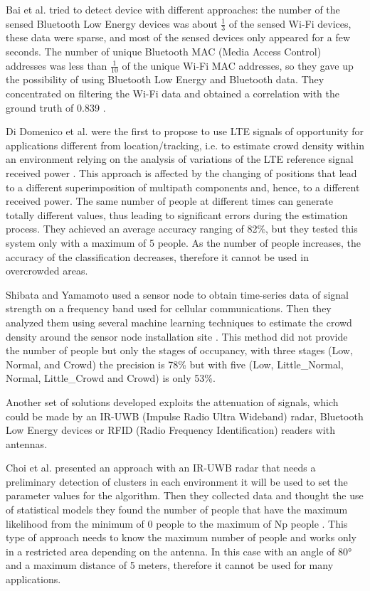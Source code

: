 Bai et al. tried to detect device with different approaches: the number of the sensed Bluetooth Low Energy devices was about $\frac{1}{3}$ of the sensed Wi-Fi devices, these data were sparse, and most of the sensed devices only appeared for a few seconds. The number of unique Bluetooth MAC (Media Access Control) addresses was less than $\frac{1}{10}$ of the unique Wi-Fi MAC addresses, so they gave up the possibility of using Bluetooth Low Energy and Bluetooth data. They concentrated on filtering the Wi-Fi data and obtained a correlation with the ground truth of 0.839 \cite{bai2017lessons}.

Di Domenico et al. were the first to propose to use LTE signals of opportunity for applications different from location/tracking, i.e. to estimate crowd density within an environment relying on the analysis of variations of the LTE reference signal received power \cite{di2017lte}. This approach is affected by the changing of positions that lead to a different superimposition of multipath components and, hence, to a different received power. The same number of people at different times can generate totally different values, thus leading to significant errors during the estimation process. They achieved an average accuracy ranging of 82\%, but they tested this system only with a maximum of 5 people. As the number of people increases, the accuracy of the classification decreases, therefore it cannot be used in overcrowded areas.

Shibata and Yamamoto used a sensor node to obtain time-series data of signal strength on a frequency band used for cellular communications. Then they analyzed them using several machine learning techniques to estimate the crowd density around the sensor node installation site \cite{shibata2019people}. This method did not provide the number of people but only the stages of occupancy, with three stages (Low, Normal, and Crowd) the precision is 78\% but with five (Low, Little\_Normal, Normal, Little\_Crowd and Crowd) is only 53\%. 

Another set of solutions developed exploits the attenuation of signals, which could be made by an IR-UWB (Impulse Radio Ultra Wideband) radar, Bluetooth Low Energy devices or RFID (Radio Frequency Identification) readers with antennas.

Choi et al. presented an approach with an IR-UWB radar that needs a preliminary detection of clusters in each environment it will be used to set the parameter values for the algorithm. Then they collected data and thought the use of statistical models they found the number of people that have the maximum likelihood from the minimum of 0 people to the maximum of Np people \cite{choi2017people}. 
This type of approach needs to know the maximum number of people and works only in a restricted area depending on the antenna. In this case with an angle of \ang{80} and a maximum distance of 5 meters, therefore it cannot be used for many applications.

